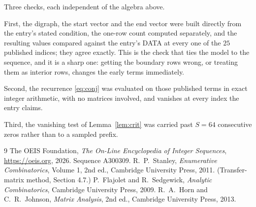 \documentclass[11pt,a4paper]{article}
\theoremstyle{plain}
\theoremstyle{definition}
\begin{document}
Three checks, each independent of the algebra above.

First, the digraph, the start vector and the end vector were built directly from the
entry's stated condition, the one-row count computed separately, and the resulting values
compared against the entry's DATA at every one of the $25$ published indices; they
agree exactly. This is the check that ties the model to the sequence, and it is a sharp one:
getting the boundary rows wrong, or treating them as interior rows, changes the early terms
immediately.

Second, the recurrence \eqref{eq:conj} was evaluated on those published terms in exact
integer arithmetic, with no matrices involved, and vanishes at every index the entry claims.

Third, the vanishing test of Lemma~\ref{lem:crit} was carried past $S=64$ consecutive
zeros rather than to a sampled prefix.

\begin{thebibliography}{9}
 The OEIS Foundation, \emph{The On-Line Encyclopedia of Integer
Sequences}, \url{https://oeis.org}, 2026. Sequence A300309.
 R.~P.~Stanley, \emph{Enumerative Combinatorics}, Volume 1, 2nd ed.,
Cambridge University Press, 2011. (Transfer-matrix method, Section 4.7.)
 P.~Flajolet and R.~Sedgewick, \emph{Analytic Combinatorics}, Cambridge
University Press, 2009.
 R.~A.~Horn and C.~R.~Johnson, \emph{Matrix Analysis}, 2nd ed., Cambridge
University Press, 2013.
\end{thebibliography}
\end{document}
